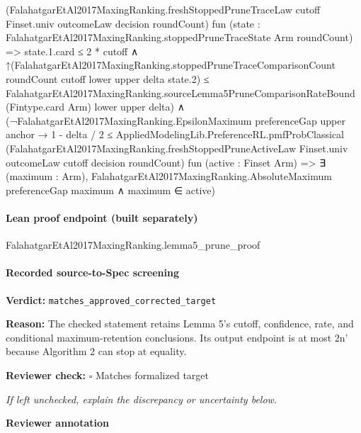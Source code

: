 \documentclass[10pt]{article}
\newcommand{\reviewerbox}{%
  \par\noindent\fbox{\parbox{0.96\linewidth}{\rule{0pt}{0.38in}}}\par
}
\newcommand{\reviewmatch}[1]{%
  \par\noindent\textbf{Reviewer check:} $\square$\; #1\par
  \noindent\emph{If left unchecked, explain the discrepancy or uncertainty below.}\par
}
\begin{document}
\begin{ReviewVerbatim}
                          (FalahatgarEtAl2017MaxingRanking.freshStoppedPruneTraceLaw cutoff Finset.univ outcomeLaw
                            decision roundCount)
                          fun (state : FalahatgarEtAl2017MaxingRanking.stoppedPruneTraceState Arm roundCount) =>
                          state.1.card ≤ 2 * cutoff ∧
                            ↑(FalahatgarEtAl2017MaxingRanking.stoppedPruneTraceComparisonCount roundCount cutoff lower
                                  upper delta state.2) ≤
                              FalahatgarEtAl2017MaxingRanking.sourceLemma5PruneComparisonRateBound (Fintype.card Arm)
                                lower upper delta) ∧
                      (¬FalahatgarEtAl2017MaxingRanking.EpsilonMaximum preferenceGap upper anchor →
                        1 - delta / 2 ≤
                          AppliedModelingLib.PreferenceRL.pmfProbClassical
                            (FalahatgarEtAl2017MaxingRanking.freshStoppedPruneActiveLaw Finset.univ outcomeLaw cutoff
                              decision roundCount)
                            fun (active : Finset Arm) =>
                            ∃ (maximum : Arm),
                              FalahatgarEtAl2017MaxingRanking.AbsoluteMaximum preferenceGap maximum ∧ maximum ∈ active)
\end{ReviewVerbatim}

\paragraph{Lean proof endpoint (built separately)}\begin{ReviewVerbatim}
FalahatgarEtAl2017MaxingRanking.lemma5_prune_proof
\end{ReviewVerbatim}

\paragraph{Recorded source-to-Spec screening}
\textbf{Verdict:} \texttt{matches\_approved\_corrected\_target}
\\
{\raggedright
\textbf{Reason:} The checked statement retains Lemma 5's cutoff, confidence, rate, and conditional maximum-\allowbreak{}retention conclusions.\allowbreak{} Its output endpoint is at most 2n' because Algorithm 2 can stop at equality.\allowbreak{}
\par}
\reviewmatch{Matches formalized target}
\noindent\textbf{Reviewer annotation}\par
\reviewerbox
\clearpage
\hypertarget{source-claim-af58d1ab93bf14de}{}
\end{document}
